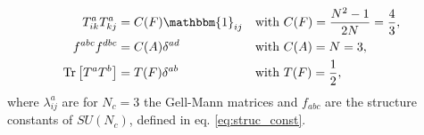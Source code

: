 \begin{align}
T^a_{ik} T^a_{kj} &= C(F)\mathbbm{1}_{ij} && \mbox{with}\ C(F) = \frac{N^2-1}{2N} = \frac{4}{3},\nonumber\\
f^{abc} f^{dbc} &= C(A)\delta^{ad} && \mbox{with}\ C(A) = N = 3,\nonumber\\
\mathrm{Tr}\left[T^aT^b\right] &= T(F)\delta^{ab} && \mbox{with}\ T(F) = \frac{1}{2},\label{eq:DynkinIndex}
\end{align}
where $\lambda^a_{ij}$ are for $N_c = 3$ the Gell-Mann matrices and $f_{abc}$ are the structure constants of $SU(N_c)$, defined in eq. \eqref{eq:struc_const}.



